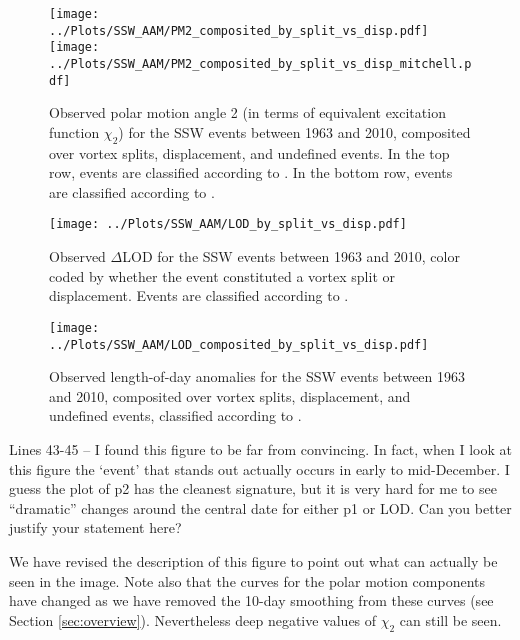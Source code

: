 \documentclass[a4paper,10pt]{article}
\begin{document}
\begin{figure}
  \noindent
\texttt{[image: ../Plots/SSW\_AAM/PM2\_composited\_by\_split\_vs\_disp.pdf]}
\texttt{[image: ../Plots/SSW\_AAM/PM2\_composited\_by\_split\_vs\_disp\_mitchell.pdf]}
   \caption{Observed polar motion angle 2 (in terms of equivalent excitation function $\chi_2$) for the SSW events between 1963 and 2010, composited over vortex splits, displacement, and undefined events. In the top row, events are classified according to \cite{Charlton2007}.  In the bottom row, events are classified according to \citet{Mitchell2012}.}
   \label{fig:PM2_composited_by_Type}
 \end{figure}

 \begin{figure}
  \noindent
\texttt{[image: ../Plots/SSW\_AAM/LOD\_by\_split\_vs\_disp.pdf]}
   \caption{Observed $\Delta$LOD for the SSW events between 1963 and 2010, color coded by whether the event constituted a vortex split or displacement. Events are classified according to \cite{Charlton2007}.}
   \label{fig:LOD_by_Type}
 \end{figure}
 
\begin{figure}
  \noindent
\texttt{[image: ../Plots/SSW\_AAM/LOD\_composited\_by\_split\_vs\_disp.pdf]}
   \caption{Observed length-of-day anomalies for the SSW events between 1963 and 2010, composited over vortex splits, displacement, and undefined events, classified according to \cite{Charlton2007}.}
   \label{fig:LOD_composited_by_Type}
 \end{figure}
 







\textcolor{reviewer}{Lines 43-45 – I found this figure to be far from convincing. In fact, when I look at this
figure the ‘event’ that stands out actually occurs in early to mid-December. I guess the
plot of p2 has the cleanest signature, but it is very hard for me to see “dramatic” changes
around the central date for either p1 or LOD. Can you better justify your statement here?}
\vspace{0.5cm}

We have revised the description of this figure to point out what can actually be seen in the image.
Note also that the curves for the polar motion components have changed as we have removed the 10-day smoothing from these curves (see Section \ref{sec:overview}).
Nevertheless deep negative values of $\chi_2$ can still be seen.
\vspace{0.5cm}
\end{document}
